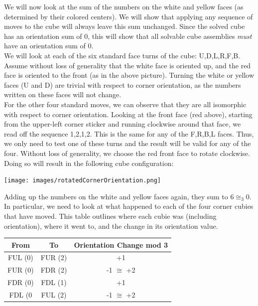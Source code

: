 \documentclass[10pt,letterpaper]{report}
\begin{document}
We will now look at the sum of the numbers on the white and yellow faces (as determined by their colored centers).  We will show that applying any sequence of moves to the cube will always leave this sum unchanged.  Since the solved cube has an orientation sum of 0, this will show that all solvable cube assemblies \textit{must} have an orientation sum of 0. \\

We will look at each of the six standard face turns of the cube: U,D,L,R,F,B.  Assume without loss of generality that the white face is oriented up, and the red face is oriented to the front (as in the above picture).  Turning the white or yellow faces (U and D) are trivial with respect to corner orientation, as the numbers written on these faces will not change. \\

For the other four standard moves, we can observe that they are all isomorphic with respect to corner orientation.  Looking at the front face (red above), starting from the upper-left corner sticker and running clockwise around that face, we read off the sequence 1,2,1,2.  This is the same for any of the F,R,B,L faces.  Thus, we only need to test one of these turns and the result will be valid for any of the four.  Without loss of generality, we choose the red front face to rotate clockwise.  Doing so will result in the following cube configuration:

\begin{center}
\texttt{[image: images/rotatedCornerOrientation.png]} 
\end{center}

Adding up the numbers on the white and yellow faces again, they sum to $6 \cong_3 0$.  In particular, we need to look at what happened to each of the four corner cubies that have moved.  This table outlines where each cubie was (including orientation), where it went to, and the change in its orientation value.

\begin{center}
\begin{tabular}{|c|c|c|}
\hline 
From	 & To & Orientation Change mod 3 \\ 
\hline 
FUL (0) & FUR (2) & +1 \\ 
\hline 
FUR (0) & FDR (2) & -1 $\cong$ +2 \\ 
\hline 
FDR (0) & FDL (1) & +1 \\ 
\hline 
FDL (0 & FUL (2) & -1 $\cong$ +2 \\ 
\hline 
\end{tabular} 
\end{center}
\end{document}
